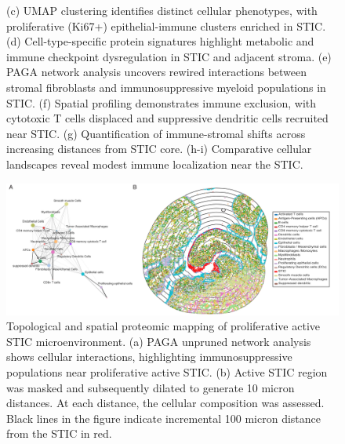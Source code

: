 \begin{refsection}
    \begin{figure}[h!]
        \ContinuedFloat
        \captionsetup{font=small}
        \caption[]{(c) UMAP clustering identifies distinct cellular phenotypes, with proliferative (Ki67+) epithelial-immune clusters enriched in STIC. (d) Cell-type-specific protein signatures highlight metabolic and immune checkpoint dysregulation in STIC and adjacent stroma. (e) PAGA network analysis uncovers rewired interactions between stromal fibroblasts and immunosuppressive myeloid populations in STIC. (f) Spatial profiling demonstrates immune exclusion, with cytotoxic T cells displaced and suppressive dendritic cells recruited near STIC. (g) Quantification of immune-stromal shifts across increasing distances from STIC core. (h-i) Comparative cellular landscapes reveal modest immune localization near the STIC.}
    \end{figure}

    \begin{figure}[H]
        \begin{center}
            \includegraphics[width=1\textwidth,height=0.9\textheight,keepaspectratio,clip,page=1]{figures/chapter3/FigS3.jpg}
            \captionsetup{font=small}
            \caption{ Topological and spatial proteomic mapping of proliferative active STIC microenvironment. (a) PAGA unpruned network analysis shows cellular interactions, highlighting immunosuppressive populations near proliferative active STIC. (b) Active STIC region was masked and subsequently dilated to generate 10 micron distances. At each distance, the cellular composition was assessed. Black lines in the figure indicate incremental 100 micron distance from the STIC in red.}
            \label{chapter3_figS3}
        \end{center}
    \end{figure}
    
    

\end{refsection}
